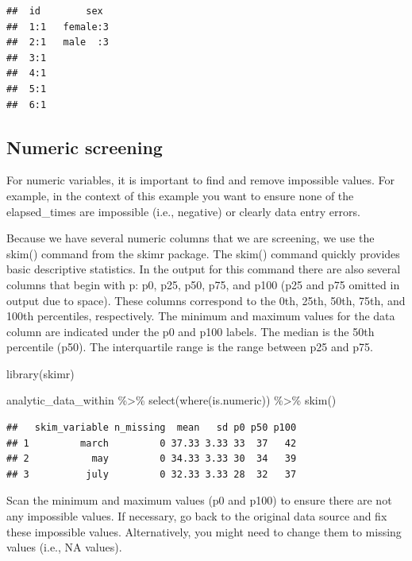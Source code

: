 \documentclass[
]{krantz}
\makeatletter
\newenvironment{Shaded}{\begin{snugshade}}{\end{snugshade}}
\newcommand{\FunctionTok}[1]{\textcolor[rgb]{0,0,0}{#1}}
\newcommand{\NormalTok}[1]{#1}
\newcommand{\SpecialCharTok}[1]{\textcolor[rgb]{0,0,0}{#1}}
\newenvironment{kframe}{%
\medskip{}
\setlength{\fboxsep}{.8em}
 \def\at@end@of@kframe{}%
 \ifinner\ifhmode%
  \def\at@end@of@kframe{\end{minipage}}%
  \begin{minipage}{\columnwidth}%
 \fi\fi%
 \def\FrameCommand##1{\hskip\@totalleftmargin \hskip-\fboxsep
 \colorbox{shadecolor}{##1}\hskip-\fboxsep
     \hskip-\linewidth \hskip-\@totalleftmargin \hskip\columnwidth}%
 \MakeFramed {\advance\hsize-\width
   \@totalleftmargin\z@ \linewidth\hsize
   \@setminipage}}%
 {\par\unskip\endMakeFramed%
 \at@end@of@kframe}
\renewenvironment{Shaded}{\begin{kframe}}{\end{kframe}}
\makeatother
\begin{document}
\begin{verbatim}
##  id        sex   
##  1:1   female:3  
##  2:1   male  :3  
##  3:1             
##  4:1             
##  5:1             
##  6:1
\end{verbatim}

\hypertarget{numeric-screening-3}{%
\subsection{Numeric screening}\label{numeric-screening-3}}

For numeric variables, it is important to find and remove impossible values. For example, in the context of this example you want to ensure none of the elapsed\_times are impossible (i.e., negative) or clearly data entry errors.

Because we have several numeric columns that we are screening, we use the skim() command from the skimr package. The skim() command quickly provides basic descriptive statistics. In the output for this command there are also several columns that begin with p: p0, p25, p50, p75, and p100 (p25 and p75 omitted in output due to space). These columns correspond to the 0th, 25th, 50th, 75th, and 100th percentiles, respectively. The minimum and maximum values for the data column are indicated under the p0 and p100 labels. The median is the 50th percentile (p50). The interquartile range is the range between p25 and p75.

\begin{Shaded}
\begin{Highlighting}[]
\FunctionTok{library}\NormalTok{(skimr)}

\NormalTok{analytic\_data\_within }\SpecialCharTok{\%\textgreater{}\%}
  \FunctionTok{select}\NormalTok{(}\FunctionTok{where}\NormalTok{(is.numeric)) }\SpecialCharTok{\%\textgreater{}\%}
  \FunctionTok{skim}\NormalTok{()}
\end{Highlighting}
\end{Shaded}

\begin{verbatim}
##   skim_variable n_missing  mean   sd p0 p50 p100
## 1         march         0 37.33 3.33 33  37   42
## 2           may         0 34.33 3.33 30  34   39
## 3          july         0 32.33 3.33 28  32   37
\end{verbatim}

Scan the minimum and maximum values (p0 and p100) to ensure there are not any impossible values. If necessary, go back to the original data source and fix these impossible values. Alternatively, you might need to change them to missing values (i.e., NA values).
\end{document}
